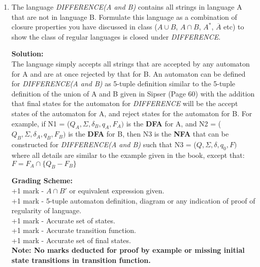 \documentclass[11pt, article, oneside]{memoir}
\begin{document}
\begin{enumerate}
    \item
        The language \textit{DIFFERENCE(A and B)} contains all strings in language A that are not in language B. Formulate this language as a combination of closure properties you have discussed in class ($A \cup B$, $A \cap B$, $A^*$, $\overline{A}$ etc) to show the class of regular languages is closed under \textit{DIFFERENCE}.
                
        \textbf{Solution:}
        \\The language simply accepts all strings that are accepted by any automaton for A and are at once rejected by that for B. An automaton can be defined  for \textit{DIFFERENCE(A and B)} as 5-tuple definition similar to the 5-tuple definition of the union of A and B given in Sipser (Page 60) with the addition that final states for the automaton for \textit{DIFFERENCE} will be the accept states of the automaton for A, and reject states for the automaton for B. For example, if N1 = (\(Q_A, \Sigma, \delta_B, q_A, F_A)\) is the \textbf{DFA} for A, and N2 = (\(Q_B, \Sigma, \delta_A, q_B, F_B)\) is the \textbf{DFA} for B, then N3 is the \textbf{NFA} that can be constructed for \textit{DIFFERENCE(A and B)} such that N3 = (\(Q, \Sigma, \delta, q_0, F)\) where all details are similar to the example given in the book, except that: \( F = F_A \cap \{Q_B - F_B\} \)

        \textbf{Grading Scheme:}
        \\+1 mark - \(A \cap B'\) or equivalent expression given.
        \\+1 mark - 5-tuple automaton definition, diagram or any indication of proof of regularity of language.
        \\+1 mark - Accurate set of states.
        \\+1 mark - Accurate transition function.
        \\+1 mark - Accurate set of final states.
        \\\textbf{Note: No marks deducted for proof by example or missing initial state transitions in transition function.}
        
\end{enumerate}
\end{document}
